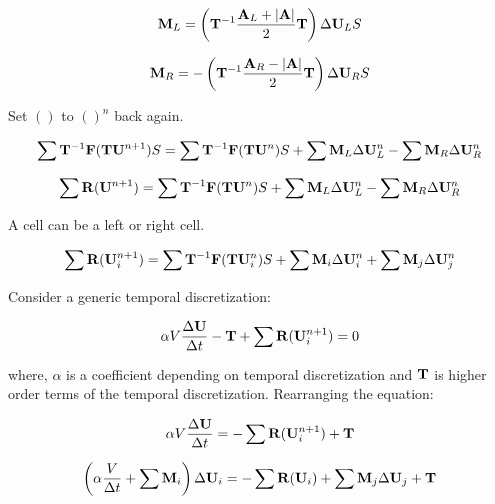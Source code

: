 \documentclass{article}
\begin{document}
\begin{equation}
    \mathbf{M}_L
    =
    \left(
        \mathbf{T}^{-1}\frac{\mathbf{A}_L + \lvert\mathbf{A}\rvert}{2}\mathbf{T}
    \right)
    \Delta\mathbf{U}_LS
\end{equation}

\begin{equation}
    \mathbf{M}_R
    =
    -\left(
        \mathbf{T}^{-1}\frac{\mathbf{A}_R - \lvert\mathbf{A}\rvert}{2}\mathbf{T}
    \right)
    \Delta\mathbf{U}_RS
\end{equation}

Set $()$ to $()^n$ back again.

\begin{equation}
    \sum\mathbf{T}^{-1}\mathbf{F}(\mathbf{T}\mathbf{U}^{n+1})S
    =
    \sum\mathbf{T}^{-1}\mathbf{F}(\mathbf{T}\mathbf{U}^{n})S
    +
    \sum\mathbf{M}_L\Delta\mathbf{U}^{n}_L
    -
    \sum\mathbf{M}_R\Delta\mathbf{U}^{n}_R
\end{equation}

\begin{equation}
    \sum\mathbf{R}(\mathbf{U}^{n+1})
    =
    \sum\mathbf{T}^{-1}\mathbf{F}(\mathbf{T}\mathbf{U}^{n})S
    +
    \sum\mathbf{M}_L\Delta\mathbf{U}^{n}_L
    -
    \sum\mathbf{M}_R\Delta\mathbf{U}^{n}_R
\end{equation}

A cell can be a left or right cell. 

\begin{equation}
    \sum\mathbf{R}(\mathbf{U}^{n+1}_i)
    =
    \sum\mathbf{T}^{-1}\mathbf{F}(\mathbf{T}\mathbf{U}^{n}_i)S
    +
    \sum\mathbf{M}_i\Delta\mathbf{U}^{n}_i
    +
    \sum\mathbf{M}_j\Delta\mathbf{U}^{n}_j
\end{equation}

Consider a generic temporal discretization:

\begin{equation}
    \alpha V\frac{\Delta\mathbf{U}}{\Delta t}
    -
    \mathbf{T}
    +
    \sum\mathbf{R}(\mathbf{U}^{n+1}_i)
    =
    0
\end{equation}

where, $\alpha$ is a coefficient depending on temporal discretization and $\mathbf{T}$ is higher order terms of the temporal discretization. Rearranging the equation:

\begin{equation}
    \alpha V\frac{\Delta\mathbf{U}}{\Delta t}
    =
    -\sum\mathbf{R}(\mathbf{U}^{n+1}_i)
    +
    \mathbf{T}
\end{equation}

\begin{equation}
    \left(
        \alpha\frac{V}{\Delta t} + \sum\mathbf{M}_i
    \right)
    \Delta\mathbf{U}_i
    =
    -\sum\mathbf{R}(\mathbf{U}_i)
    +
    \sum\mathbf{M}_j\Delta\mathbf{U}_j
    +
    \mathbf{T}
\end{equation}
\end{document}
